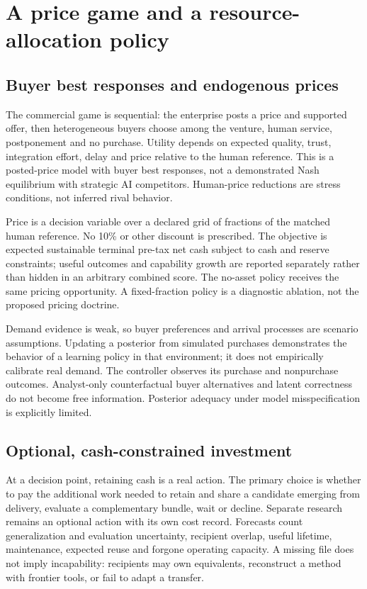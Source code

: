 \documentclass[11pt,letterpaper]{article}
\begin{document}
\section{A price game and a resource-allocation policy}
\subsection{Buyer best responses and endogenous prices}
The commercial game is sequential: the enterprise posts a price and supported offer, then heterogeneous buyers choose among the venture, human service, postponement and no purchase. Utility depends on expected quality, trust, integration effort, delay and price relative to the human reference. This is a posted-price model with buyer best responses, not a demonstrated Nash equilibrium with strategic AI competitors. Human-price reductions are stress conditions, not inferred rival behavior.

Price is a decision variable over a declared grid of fractions of the matched human reference. No 10\% or other discount is prescribed. The objective is expected sustainable terminal pre-tax net cash subject to cash and reserve constraints; useful outcomes and capability growth are reported separately rather than hidden in an arbitrary combined score. The no-asset policy receives the same pricing opportunity. A fixed-fraction policy is a diagnostic ablation, not the proposed pricing doctrine.

Demand evidence is weak, so buyer preferences and arrival processes are scenario assumptions. Updating a posterior from simulated purchases demonstrates the behavior of a learning policy in that environment; it does not empirically calibrate real demand. The controller observes its purchase and nonpurchase outcomes. Analyst-only counterfactual buyer alternatives and latent correctness do not become free information. Posterior adequacy under model misspecification is explicitly limited.

\subsection{Optional, cash-constrained investment}
At a decision point, retaining cash is a real action. The primary choice is whether to pay the additional work needed to retain and share a candidate emerging from delivery, evaluate a complementary bundle, wait or decline. Separate research remains an optional action with its own cost record. Forecasts count generalization and evaluation uncertainty, recipient overlap, useful lifetime, maintenance, expected reuse and forgone operating capacity. A missing file does not imply incapability: recipients may own equivalents, reconstruct a method with frontier tools, or fail to adapt a transfer.
\end{document}
